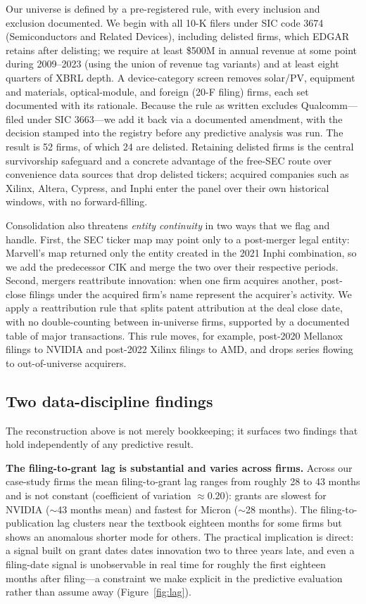 \documentclass[11pt]{article}
\begin{document}
Our universe is defined by a pre-registered rule, with every inclusion and exclusion documented. We begin with all 10-K filers under SIC code 3674 (Semiconductors and Related Devices), including delisted firms, which EDGAR retains after delisting; we require at least \$500M in annual revenue at some point during 2009--2023 (using the union of revenue tag variants) and at least eight quarters of XBRL depth. A device-category screen removes solar/PV, equipment and materials, optical-module, and foreign (20-F filing) firms, each set documented with its rationale. Because the rule as written excludes Qualcomm---filed under SIC 3663---we add it back via a documented amendment, with the decision stamped into the registry before any predictive analysis was run. The result is 52 firms, of which 24 are delisted. Retaining delisted firms is the central survivorship safeguard and a concrete advantage of the free-SEC route over convenience data sources that drop delisted tickers; acquired companies such as Xilinx, Altera, Cypress, and Inphi enter the panel over their own historical windows, with no forward-filling.

Consolidation also threatens \emph{entity continuity} in two ways that we flag and handle. First, the SEC ticker map may point only to a post-merger legal entity: Marvell's map returned only the entity created in the 2021 Inphi combination, so we add the predecessor CIK and merge the two over their respective periods. Second, mergers reattribute innovation: when one firm acquires another, post-close filings under the acquired firm's name represent the acquirer's activity. We apply a reattribution rule that splits patent attribution at the deal close date, with no double-counting between in-universe firms, supported by a documented table of major transactions. This rule moves, for example, post-2020 Mellanox filings to NVIDIA and post-2022 Xilinx filings to AMD, and drops series flowing to out-of-universe acquirers.

\subsection{Two data-discipline findings}

The reconstruction above is not merely bookkeeping; it surfaces two findings that hold independently of any predictive result.

\textbf{The filing-to-grant lag is substantial and varies across firms.} Across our case-study firms the mean filing-to-grant lag ranges from roughly 28 to 43 months and is not constant (coefficient of variation $\approx 0.20$): grants are slowest for NVIDIA ($\sim$43 months mean) and fastest for Micron ($\sim$28 months). The filing-to-publication lag clusters near the textbook eighteen months for some firms but shows an anomalous shorter mode for others. The practical implication is direct: a signal built on grant dates dates innovation two to three years late, and even a filing-date signal is unobservable in real time for roughly the first eighteen months after filing---a constraint we make explicit in the predictive evaluation rather than assume away (Figure~\ref{fig:lag}).
\end{document}
